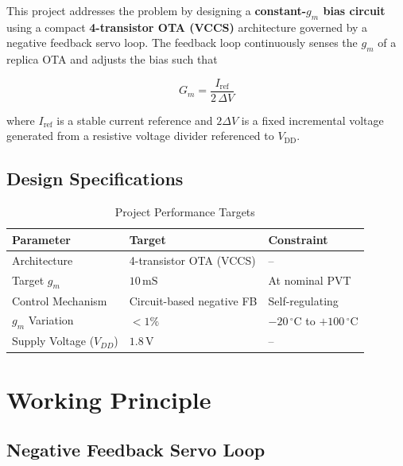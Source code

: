 \documentclass[12pt,a4paper]{article}
\begin{document}
This project addresses the problem by designing a \textbf{constant-$g_m$ bias circuit} using a
compact \textbf{4-transistor OTA (VCCS)} architecture governed by a negative feedback servo loop.
The feedback loop continuously senses the $g_m$ of a replica OTA and adjusts the bias such that

\begin{equation}
  G_m = \frac{I_{\text{ref}}}{2\,\Delta V}
\end{equation}

where $I_{\text{ref}}$ is a stable current reference and $2\Delta V$ is a fixed incremental
voltage generated from a resistive voltage divider referenced to $V_{\text{DD}}$.

\subsection*{Design Specifications}

\begin{table}[H]
  \centering
  \caption{Project Performance Targets}
  \renewcommand{\arraystretch}{1.3}
  \begin{tabular}{lll}
    \toprule
    \textbf{Parameter}        & \textbf{Target}              & \textbf{Constraint} \\
    \midrule
    Architecture              & 4-transistor OTA (VCCS)      & --                  \\
    Target $g_m$              & $10\,\text{mS}$              & At nominal PVT      \\
    Control Mechanism         & Circuit-based negative FB    & Self-regulating     \\
    $g_m$ Variation           & $< 1\%$                      & $-20\,^\circ$C to $+100\,^\circ$C \\
    Supply Voltage ($V_{DD}$) & $1.8\,\text{V}$              & --                  \\
    \bottomrule
  \end{tabular}
\end{table}

\section{Working Principle}

\subsection{Negative Feedback Servo Loop}
\end{document}
